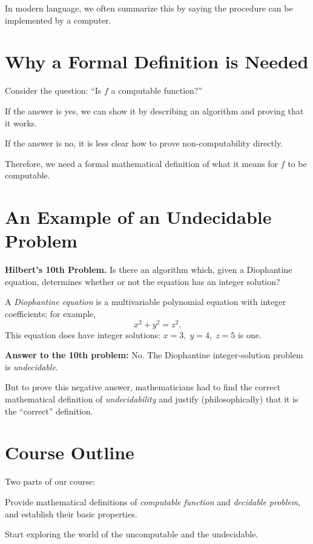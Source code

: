 \documentclass[11pt]{article}
\begin{document}
In modern language, we often summarize this by saying the procedure can be implemented by a computer.

\section{Why a Formal Definition is Needed}

Consider the question: ``Is $f$ a computable function?''

If the answer is yes, we can show it by describing an algorithm and proving that it works.

If the answer is no, it is less clear how to prove non-computability directly.

Therefore, we need a formal mathematical definition of what it means for $f$ to be computable.

\section{An Example of an Undecidable Problem}

\textbf{Hilbert's 10th Problem.} Is there an algorithm which, given a Diophantine equation, determines whether or not the equation has an integer solution?

A \emph{Diophantine equation} is a multivariable polynomial equation with integer coefficients; for example,
\[
    x^2 + y^2 = z^2.
\]
This equation does have integer solutions: $x=3,\; y=4,\; z=5$ is one.

\textbf{Answer to the 10th problem:} No. The Diophantine integer-solution problem is \emph{undecidable}.

But to prove this negative answer, mathematicians had to find the correct mathematical definition of \emph{undecidability} and justify (philosophically) that it is the ``correct'' definition.

\section{Course Outline}

Two parts of our course:

\begin{description}[leftmargin=1.8em, style=nextline]
    \item[Part 1:] Provide mathematical definitions of \emph{computable function} and \emph{decidable problem}, and establish their basic properties.
    \item[Part 2:] Start exploring the world of the uncomputable and the undecidable.
\end{description}
\end{document}
